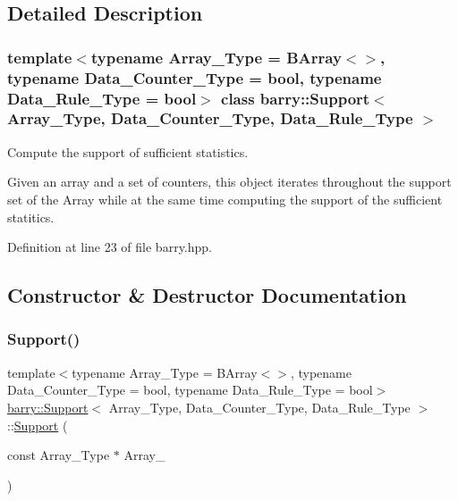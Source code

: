 \subsection{Detailed Description}
\subsubsection*{template$<$typename Array\+\_\+\+Type = B\+Array$<$$>$, typename Data\+\_\+\+Counter\+\_\+\+Type = bool, typename Data\+\_\+\+Rule\+\_\+\+Type = bool$>$\newline
class barry\+::\+Support$<$ Array\+\_\+\+Type, Data\+\_\+\+Counter\+\_\+\+Type, Data\+\_\+\+Rule\+\_\+\+Type $>$}

Compute the support of sufficient statistics. 

Given an array and a set of counters, this object iterates throughout the support set of the Array while at the same time computing the support of the sufficient statitics. 

Definition at line 23 of file barry.\+hpp.



\subsection{Constructor \& Destructor Documentation}
\mbox{\label{classbarry_1_1_support_ab34144acc225be907c1403b06573b016}} 
\subsubsection{\texorpdfstring{Support()}{Support()}\hspace{0.1cm}{\footnotesize\ttfamily [1/3]}}
{\footnotesize\ttfamily template$<$typename Array\+\_\+\+Type  = B\+Array$<$$>$, typename Data\+\_\+\+Counter\+\_\+\+Type  = bool, typename Data\+\_\+\+Rule\+\_\+\+Type  = bool$>$ \\
\hyperlink{classbarry_1_1_support}{barry\+::\+Support}$<$ Array\+\_\+\+Type, Data\+\_\+\+Counter\+\_\+\+Type, Data\+\_\+\+Rule\+\_\+\+Type $>$\+::\hyperlink{classbarry_1_1_support}{Support} (\begin{DoxyParamCaption}\item[{const Array\+\_\+\+Type $\ast$}]{Array\+\_\+ }\end{DoxyParamCaption})\hspace{0.3cm}{\ttfamily [inline]}}




